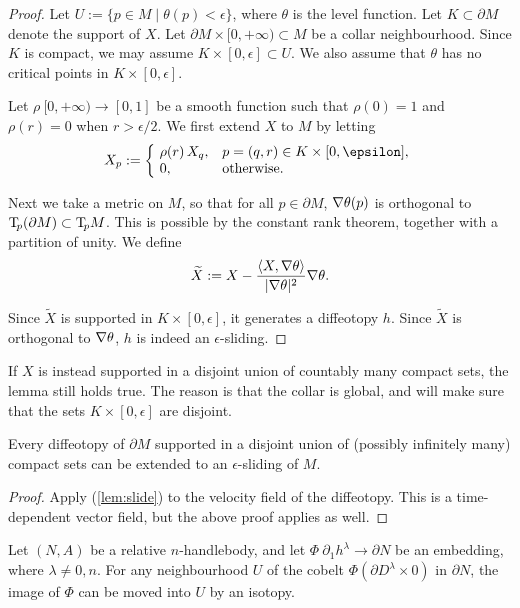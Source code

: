 \begin{proof}
Let $U:=\{p\in M\mid \theta(p)<\epsilon\}$, 
where $\theta$ is the level function.
Let $K\subset\partial M$ denote the support of $X$.
Let $\partial M\times[0,+\infty)\subset M$ be a collar neighbourhood.
Since $K$ is compact,
we may assume $K\times[0,\epsilon]\subset U$.
We also assume that $\theta$ has no critical points in $K\times[0,\epsilon]$.

Let $\rho\:[0,+\infty)\to[0,1]$ be a smooth function such that
$\rho(0)=1$ and $\rho(r)=0$ when $r>\epsilon/2$.
We first extend $X$ to $M$ by letting
\[ X_p:=\biggl\{\mkern-3mu\begin{array}{ll}
\rho(r)\,X_q,&p=(q,r)\in K\times[0,\epsilon],\\
0,&\text{otherwise}.
\end{array} \]

Next we take a metric on $M$,
so that for all $p\in\partial M$, $\nabla \theta(p)$ is orthogonal to $\mathrm{T}\!_p(\partial M)\subset\mathrm{T}\!_pM$.
This is possible by the constant rank theorem,
together with a partition of unity.
We define 
\[ \widetilde X:=X-\frac{\langle X,\nabla \theta\rangle}{|\nabla \theta|^2}\nabla \theta. \]

Since $\widetilde X$ is supported in $K\times[0,\epsilon]$,
it generates a diffeotopy $h$.
Since $\widetilde X$ is orthogonal to $\nabla\theta$,
$h$ is indeed an $\epsilon$-sliding. 
\end{proof}

\begin{remark}
If $X$ is instead supported in a disjoint union of countably many compact sets,
the lemma still holds true.
The reason is that the collar is global,
and will make sure that the sets $K\times[0,\epsilon]$ are disjoint.
\end{remark}

\begin{corollary}\label{cor:slide}
Every diffeotopy of $\partial M$ supported in
a disjoint union of \textup{(possibly infinitely many)} compact sets 
can be extended to an $\epsilon$-sliding of $M$.
\end{corollary}

\begin{proof}
Apply (\ref{lem:slide}) to the velocity field of the diffeotopy.
This is a time-dependent vector field,
but the above proof applies as well.
\end{proof}

\begin{lemma}\label{lem:shrink}
    Let $(N,A)$ be a relative $n$-handlebody, 
    and let $\Phi\:\partial_1h^\lambda\to\partial N$ be an embedding,
    where $\lambda\neq0,n$.
    For any neighbourhood $U$ of the cobelt $\Phi(\partial D^\lambda\times0)$ in $\partial N$,
    the image of $\Phi$ can be moved into $U$ by an isotopy.
\end{lemma}
    

